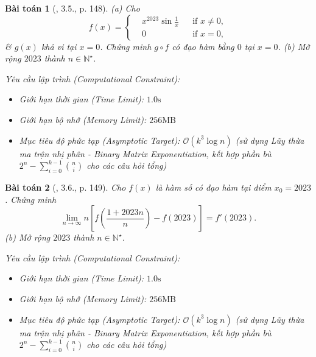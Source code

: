 \documentclass{article}
\newtheorem{baitoan}{Bài toán}
\begin{document}
\begin{baitoan}[\cite{Quoc_Long_Dat_Nam_VMC}, 3.5., p. 148]
	(a) Cho
	\begin{equation*}
		f(x) = \left\{\begin{split}
			&x^{2023}\sin\frac{1}{x}&&\mbox{if } x\ne0,\\
			&0&&\mbox{if } x = 0,
		\end{split}\right.
	\end{equation*}
	\& $g(x)$ khả vi tại $x = 0$. Chứng minh $g\circ f$ có đạo hàm bằng $0$ tại $x = 0$. (b) Mở rộng $2023$ thành $n\in\mathbb{N}^\star$.

    \vspace{0.5em}
    \emph{Yêu cầu lập trình (Computational Constraint):}
    \begin{itemize}
        \item Giới hạn thời gian (Time Limit): $1.0\mathrm{s}$
        \item Giới hạn bộ nhớ (Memory Limit): $256\mathrm{MB}$
        \item Mục tiêu độ phức tạp (Asymptotic Target): $\mathcal{O}(k^3 \log n)$ (sử dụng Lũy thừa ma trận nhị phân - Binary Matrix Exponentiation, kết hợp phần bù $2^n - \sum_{i=0}^{k-1} \binom{n}{i}$ cho các câu hỏi tổng)
    \end{itemize}
\end{baitoan}


\begin{baitoan}[\cite{Quoc_Long_Dat_Nam_VMC}, 3.6., p. 149]
	Cho $f(x)$ là hàm số có đạo hàm tại điểm $x_0 = 2023$. Chứng minh
	\begin{equation*}
		\lim_{n\to\infty} n\left[f\left(\frac{1 + 2023n}{n}\right) - f(2023)\right] = f'(2023).
	\end{equation*}
	(b) Mở rộng $2023$ thành $n\in\mathbb{N}^\star$.

    \vspace{0.5em}
    \emph{Yêu cầu lập trình (Computational Constraint):}
    \begin{itemize}
        \item Giới hạn thời gian (Time Limit): $1.0\mathrm{s}$
        \item Giới hạn bộ nhớ (Memory Limit): $256\mathrm{MB}$
        \item Mục tiêu độ phức tạp (Asymptotic Target): $\mathcal{O}(k^3 \log n)$ (sử dụng Lũy thừa ma trận nhị phân - Binary Matrix Exponentiation, kết hợp phần bù $2^n - \sum_{i=0}^{k-1} \binom{n}{i}$ cho các câu hỏi tổng)
    \end{itemize}
\end{baitoan}
\end{document}
